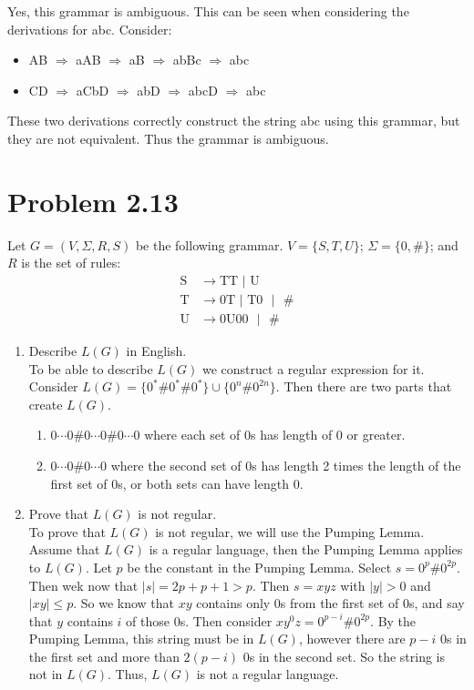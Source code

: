 \documentclass{article}
\newcommand{\tab}{\hspace*{2em}}
\begin{document}
Yes, this grammar is ambiguous.  This can be seen when considering the derivations for abc.  Consider:\\
\begin{itemize}
 \item AB $\Rightarrow$ aAB $\Rightarrow$ aB $\Rightarrow$ abBc $\Rightarrow$ abc
 \item CD $\Rightarrow$ aCbD $\Rightarrow$ abD $\Rightarrow$ abcD $\Rightarrow$ abc
\end{itemize}

These two derivations correctly construct the string abc using this grammar, but they are not equivalent.  Thus the grammar is 
ambiguous.


\section*{Problem 2.13}
Let $G = (V, \varSigma, R, S)$ be the following grammar. $V = \{S,T,U\}$; $\varSigma = \{0,\#\}$; and $R$ is the set of rules:
  \begin{align*}
   \text{S} &\rightarrow  \text{TT }|\text{ U} \\
   \text{T} &\rightarrow 0\text{T }|\text{ T}0\text{ }|\text{ }\# \\
   \text{U} &\rightarrow 0\text{U}00\text{ }|\text{ }\#
  \end{align*}
  \begin{enumerate}
   \item Describe $L(G)$ in English.\\
      \tab To be able to describe $L(G)$ we construct a regular expression for it.  Consider $L(G) = \{0^* \# 0^* \# 0^* \} \cup 
      \{0^n \# 0^{2n} \}$.  Then there are two parts that create $L(G)$.
      \begin{enumerate}
       \item $0\cdots0 \# 0\cdots0 \# 0\cdots0$ where each set of 0s has length of 0 or greater.
       \item $0\cdots0 \# 0\cdots0$ where the second set of 0s has length 2 times the length of the first set of 0s, or both sets
	  can have length 0.
      \end{enumerate}
   \item Prove that $L(G)$ is not regular.\\
      \tab To prove that $L(G)$ is not regular, we will use the Pumping Lemma.  Assume that $L(G)$ is a regular language, then the 
      Pumping Lemma applies to $L(G)$.  Let $p$ be the constant in the Pumping Lemma.  Select $s = 0^p\#0^{2p}$.  Then wek now that 
      $|s| = 2p+p+1 > p$.  Then $s=xyz$ with $|y|>0$ and $|xy| \leq p$.  So we know that $xy$ contains only 0s from the first set of 
      0s, and say that $y$ contains $i$ of those 0s.  Then consider $xy^0z = 0^{p-i}\#0^{2p}$.  By the Pumping Lemma, this string 
      must be in $L(G)$, however there are $p-i$ 0s in the first set and more than $2(p-i)$ 0s in the second set.  So the string is 
      not in $L(G)$.  Thus, $L(G)$ is not a regular language.
  \end{enumerate}
\end{document}
